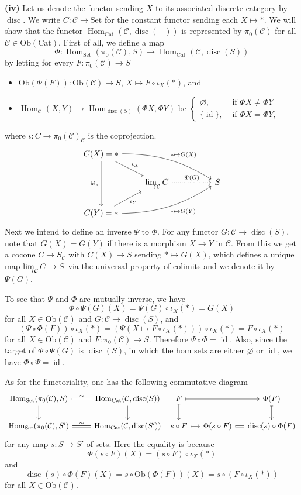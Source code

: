 \documentclass[a4paper,11pt]{amsart}
\DeclareMathOperator{\id}{id}
\newcommand{\set}{\mathrm{Set}}
\newcommand{\C}{\mathcal C}
\renewcommand{\hom}{\operatorname{Hom}}
\newcommand{\ilim}{\varinjlim}
\newcommand{\cat}{\mathrm{Cat}}
\newcommand{\ob}{\mathrm{Ob}}
\newcommand{\disc}{\operatorname{disc}}
\begin{document}
\textbf{(iv)} Let us denote the functor sending $X$ to its associated discrete category by $\disc$. We write $C\colon\C\to\set$ for the constant functor sending each $X\mapsto *$. We will show that the functor $\hom_\cat(\C,\disc(-))$ is represented by $\pi_0(\C)$ for all $\C\in\ob(\cat)$. First of all, we define a map
\[
\Phi\colon\hom_\set(\pi_0(\C),S)\to\hom_\cat(\C,\disc(S))
\]
by letting for every $F\colon\pi_0(\C)\to S$ 
\begin{itemize}
\item $\ob(\Phi(F))\colon\ob(\C)\to S$, $X\mapsto F\circ\iota_X(*)$, and

\item $\hom_\C(X,Y)\to\hom_{\disc(S)}(\Phi X,\Phi Y)$ be $\left\{\begin{array}{ll}
\varnothing,&\text{ if }\Phi X\neq\Phi Y\\
\{\id\},&\text{ if }\Phi X=\Phi Y,
\end{array}\right.$
\end{itemize}
where $\iota\colon C\to \pi_0(\C)_\C$ is the coprojection.
\[
\begin{tikzcd}
C(X)=*\arrow[dr,"\iota_X"]\arrow[drrr,bend left=15,"*\mapsto G(X)"]\arrow[dd,"\id_*"']&&&\\
&\ilim_\C C\arrow[rr,dotted,"\Psi(G)"]&& S\\
C(Y)=*\arrow[ur,"\iota_Y"']\arrow[urrr,bend right=15,"*\mapsto G(Y)"']&&&
\end{tikzcd}
\]
Next we intend to define an inverse $\Psi$ to $\Phi$. For any functor $G\colon\C\to\disc(S)$, note that $G(X)=G(Y)$ if there is a morphism $X\to Y$ in $\C$. From this we get a cocone $C\to S_\C$ with $C(X)\to S$ sending $*\mapsto G(X)$, which defines a unique map $\ilim_\C C\to S$ via the universal property of colimits and we denote it by $\Psi(G)$. 

To see that $\Psi$ and $\Phi$ are mutually inverse, we have
\[
\Phi\circ\Psi(G)(X)=\Psi(G)\circ\iota_X(*)=G(X)
\]
for all $X\in\ob(\C)$ and $G\colon\C\to\disc (S)$, and
\[
(\Psi\circ\Phi(F))\circ\iota_X(*)=(\Psi(X\mapsto F\circ\iota_X(*)))\circ\iota_X(*)=F\circ\iota_X(*)
\]
for all $X\in\ob(\C)$ and $F\colon\pi_0(\C)\to S$. Therefore $\Psi\circ\Phi=\id$. Also, since the target of $\Phi\circ\Psi(G)$ is $\disc(S)$, in which the hom sets are either $\varnothing$ or $\id$, we have $\Phi\circ\Psi=\id$. 

As for the functoriality, one has the following commutative diagram
\[
\begin{tikzcd}
\hom_\set(\pi_0(\C),S)\arrow[r,equal,"\sim"]\arrow[d]& \hom_\cat(\C,\disc(S))\arrow[d]\\
\hom_\set(\pi_0(\C),S')\arrow[r,equal,"\sim"]& \hom_\cat(\C,\disc(S'))
\end{tikzcd}
\ 
\begin{tikzcd}[column sep=small]
F\arrow[rr,mapsto]\arrow[d,mapsto]&& \Phi(F)\arrow[d,mapsto]\\
s\circ F\arrow[r,mapsto]& \Phi(s\circ F)\arrow[r,equal]& \disc(s)\circ\Phi(F)
\end{tikzcd}
\]
for any map $s\colon S\to S'$ of sets. Here the equality is because
\[
\Phi(s\circ F)(X)=(s\circ F)\circ \iota_X(*)
\]
and
\[
\disc(s)\circ\Phi(F)(X)=s\circ\ob(\Phi(F))(X)=s\circ(F\circ\iota_X(*))
\]
for all $X\in\ob(\C)$.
\end{document}
